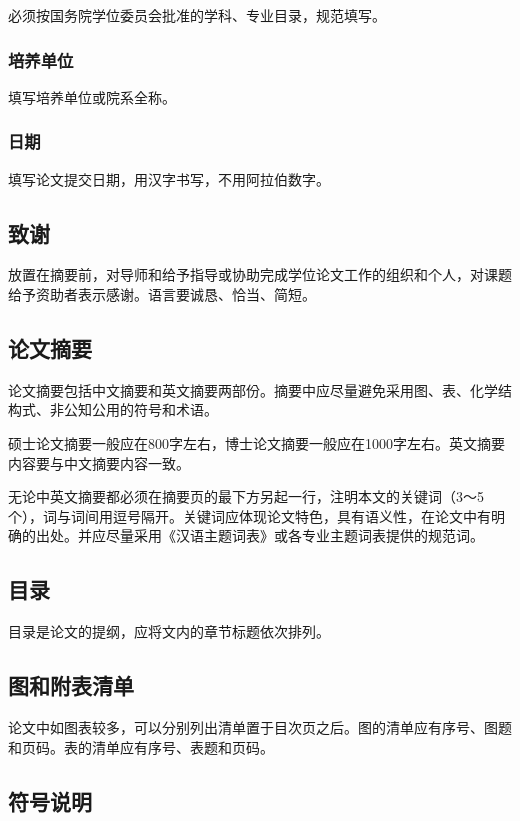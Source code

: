 \documentclass[a4paper,12pt,oneside,openany]{book}
\begin{document}
\begin{CJK}{UTF8}{hei}
必须按国务院学位委员会批准的学科、专业目录，规范填写。


\subsubsection{培养单位}

填写培养单位或院系全称。


\subsubsection{日期}

填写论文提交日期，用汉字书写，不用阿拉伯数字。


\subsection{致谢}

放置在摘要前，对导师和给予指导或协助完成学位论文工作的组织和个人，对课题给予资助者表示感谢。语言要诚恳、恰当、简短。


\subsection{论文摘要}

论文摘要包括中文摘要和英文摘要两部份。摘要中应尽量避免采用图、表、化学结构式、非公知公用的符号和术语。

硕士论文摘要一般应在800字左右，博士论文摘要一般应在1000字左右。英文摘要内容要与中文摘要内容一致。

无论中英文摘要都必须在摘要页的最下方另起一行，注明本文的关键词（3～5个），词与词间用逗号隔开。关键词应体现论文特色，具有语义性，在论文中有明确的出处。并应尽量采用《汉语主题词表》或各专业主题词表提供的规范词。 


\subsection{目录}

目录是论文的提纲，应将文内的章节标题依次排列。


\subsection{图和附表清单}

论文中如图表较多，可以分别列出清单置于目次页之后。图的清单应有序号、图题和页码。表的清单应有序号、表题和页码。


\subsection{符号说明}


\end{CJK}
\end{document}
